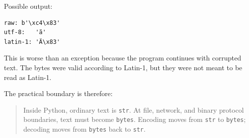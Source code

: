 Possible output:

\begin{verbatim}
raw: b'\xc4\x83'
utf-8:   'ă'
latin-1: 'Ä\x83'
\end{verbatim}

This is worse than an exception because the program continues with corrupted text. The bytes were valid according to Latin-1, but they were not meant to be read as Latin-1.

The practical boundary is therefore:

\begin{quote}
Inside Python, ordinary text is \texttt{str}. At file, network, and binary protocol boundaries, text must become \texttt{bytes}. Encoding moves from \texttt{str} to \texttt{bytes}; decoding moves from \texttt{bytes} back to \texttt{str}.
\end{quote}